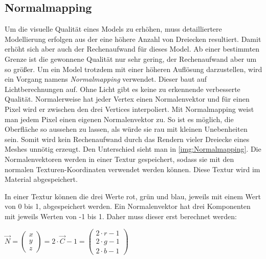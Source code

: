 \subsection{Normalmapping}
\label{section:Normalmapping}

Um die visuelle Qualität eines Models zu erhöhen, muss detailliertere Modellierung erfolgen aus der eine höhere Anzahl von Dreiecken resultiert. 
Damit erhöht sich aber auch der Rechenaufwand für dieses Model. Ab einer bestimmten Grenze ist die gewonnene Qualität nur sehr gering, der Rechenaufwand aber um so größer. 
Um ein Model trotzdem mit einer höheren Auflösung darzustellen, wird ein Vorgang namens \textit{Normalmapping} verwendet. 
Dieser baut auf Lichtberechnungen auf. Ohne Licht gibt es keine zu erkennende verbesserte Qualität. Normalerweise hat jeder Vertex einen Normalenvektor und für einen Pixel wird er zwischen den drei Vertices interpoliert. 
Mit Normalmapping weist man jedem Pixel einen eigenen Normalenvektor zu. So ist es möglich, die Oberfläche so aussehen zu lassen, als würde sie rau mit kleinen Unebenheiten sein. Somit wird kein Rechenaufwand durch das Rendern vieler Dreiecke eines Meshes unnötig erzeugt.
Den Unterschied sieht man in \cref{img:Normalmapping}. Die Normalenvektoren werden in einer Textur gespeichert, sodass sie mit den normalen Texturen-Koordinaten verwendet werden können. Diese Textur wird im Material abgespeichert.

In einer Textur können die drei Werte rot, grün und blau, jeweils mit einem Wert von 0 bis 1, abgespeichert werden. Ein Normalenvektor hat drei Komponenten mit jeweils Werten von -1 bis 1. Daher muss dieser erst berechnet werden:

$ \overrightarrow{N} = 
\begin{pmatrix}
x \\ y \\ z
\end{pmatrix}
 = 2 \cdot \overrightarrow{C} - 1 = 
 \begin{pmatrix}
 2 \cdot r - 1 \\ 2 \cdot g - 1 \\ 2 \cdot b - 1
 \end{pmatrix}$
 
